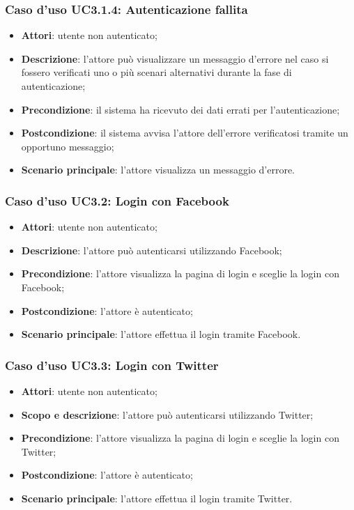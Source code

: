 \subsubsection{Caso d'uso UC3.1.4: Autenticazione fallita}
\begin{itemize}
	\item \textbf{Attori}: utente non autenticato;
	\item \textbf{Descrizione}: l'attore può visualizzare un messaggio d'errore nel caso si fossero verificati uno o più scenari alternativi durante la fase di autenticazione;
	\item \textbf{Precondizione}: il sistema ha ricevuto dei dati errati per l'autenticazione;
	\item \textbf{Postcondizione}: il sistema avvisa l'attore dell'errore verificatosi tramite un opportuno messaggio;
	\item \textbf{Scenario principale}: l'attore visualizza un messaggio d'errore.
\end{itemize}

\subsubsection{Caso d'uso UC3.2: Login con Facebook}
\begin{itemize}
	\item \textbf{Attori}: utente non autenticato;
	\item \textbf{Descrizione}: l'attore può autenticarsi utilizzando Facebook;
	\item \textbf{Precondizione}: l'attore visualizza la pagina di login e sceglie la login con Facebook;
	\item \textbf{Postcondizione}: l'attore è autenticato;
	\item \textbf{Scenario principale}: l'attore effettua il login tramite Facebook.
\end{itemize}
\subsubsection{Caso d'uso UC3.3: Login con Twitter}
\begin{itemize}
	\item \textbf{Attori}: utente non autenticato;
	\item \textbf{Scopo e descrizione}: l'attore può autenticarsi utilizzando Twitter;
	\item \textbf{Precondizione}: l'attore visualizza la pagina di login e sceglie la login con Twitter;
	\item \textbf{Postcondizione}: l'attore è autenticato;
	\item \textbf{Scenario principale}: l'attore effettua il login tramite Twitter.
\end{itemize}
